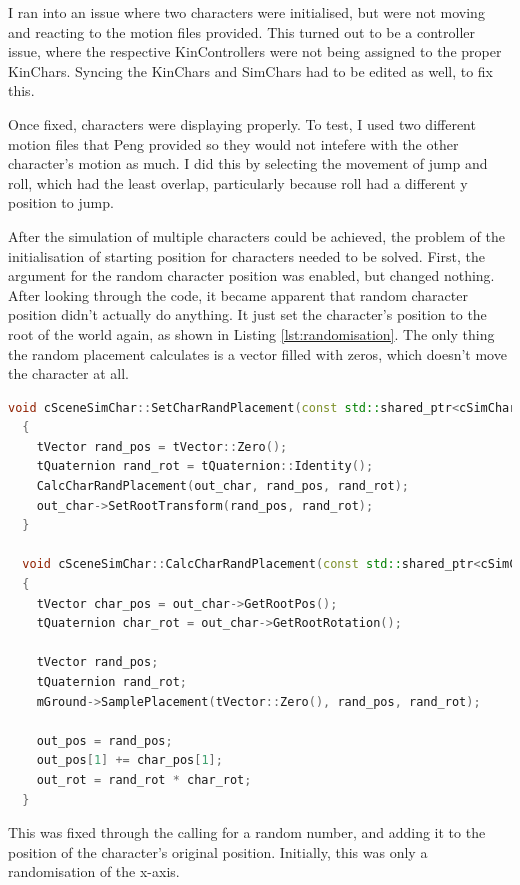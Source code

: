 \documentclass{l4proj}
\begin{document}
I ran into an issue where two characters were initialised, but were not moving and reacting to the motion files provided. This turned out to be a controller issue, where the respective KinControllers were not being assigned to the proper KinChars. Syncing the KinChars and SimChars had to be edited as well, to fix this.

Once fixed, characters were displaying properly. To test, I used two different motion files that Peng provided so they would not intefere with the other character's motion as much. I did this by selecting the movement of jump and roll, which had the least overlap, particularly because roll had a different y position to jump.

After the simulation of multiple characters could be achieved, the problem of the initialisation of starting position for characters needed to be solved. First, the argument for the random character position was enabled, but changed nothing. After looking through the code, it became apparent that random character position didn't actually do anything. It just set the character's position to the root of the world again, as shown in Listing \ref{lst:randomisation}. The only thing the random placement calculates is a vector filled with zeros, which doesn't move the character at all.

\begin{lstlisting}[language=C++, float, caption={The function related to character position randomisation}, label=lst:randomisation]
  void cSceneSimChar::SetCharRandPlacement(const std::shared_ptr<cSimCharacter>& out_char)
  {
    tVector rand_pos = tVector::Zero();
    tQuaternion rand_rot = tQuaternion::Identity();
    CalcCharRandPlacement(out_char, rand_pos, rand_rot);
    out_char->SetRootTransform(rand_pos, rand_rot);
  }

  void cSceneSimChar::CalcCharRandPlacement(const std::shared_ptr<cSimCharacter>& out_char, tVector& out_pos, tQuaternion& out_rot)
  {
    tVector char_pos = out_char->GetRootPos();
    tQuaternion char_rot = out_char->GetRootRotation();

    tVector rand_pos;
    tQuaternion rand_rot;
    mGround->SamplePlacement(tVector::Zero(), rand_pos, rand_rot);

    out_pos = rand_pos;
    out_pos[1] += char_pos[1];
    out_rot = rand_rot * char_rot;
  }

\end{lstlisting}

This was fixed through the calling for a random number, and adding it to the position of the character's original position. Initially, this was only a randomisation of the x-axis.
\end{document}
